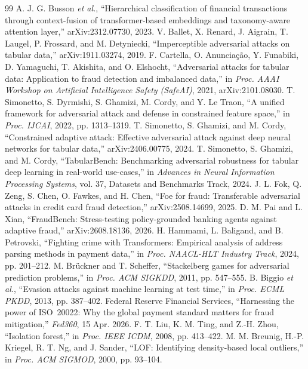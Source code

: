 \documentclass[conference]{IEEEtran}
\begin{document}
\begin{thebibliography}{99}
A. J. G. Busson \emph{et al.}, ``Hierarchical classification of financial
transactions through context-fusion of transformer-based embeddings and
taxonomy-aware attention layer,'' arXiv:2312.07730, 2023.
V. Ballet, X. Renard, J. Aigrain, T. Laugel, P. Frossard, and M. Detyniecki,
``Imperceptible adversarial attacks on tabular data,'' arXiv:1911.03274, 2019.
F. Cartella, O. Anuncia\c{c}\~ao, Y. Funabiki, D. Yamaguchi, T. Akishita, and
O. Elshocht, ``Adversarial attacks for tabular data: Application to fraud
detection and imbalanced data,'' in \emph{Proc. AAAI Workshop on Artificial
Intelligence Safety (SafeAI)}, 2021, arXiv:2101.08030.
T. Simonetto, S. Dyrmishi, S. Ghamizi, M. Cordy, and Y. Le Traon, ``A unified
framework for adversarial attack and defense in constrained feature space,''
in \emph{Proc. IJCAI}, 2022, pp. 1313--1319.
T. Simonetto, S. Ghamizi, and M. Cordy, ``Constrained adaptive attack:
Effective adversarial attack against deep neural networks for tabular data,''
arXiv:2406.00775, 2024.
T. Simonetto, S. Ghamizi, and M. Cordy, ``TabularBench: Benchmarking
adversarial robustness for tabular deep learning in real-world use-cases,'' in
\emph{Advances in Neural Information Processing Systems}, vol. 37, Datasets
and Benchmarks Track, 2024.
J. L. Fok, Q. Zeng, S. Chen, O. Fawkes, and H. Chen, ``Foe for fraud:
Transferable adversarial attacks in credit card fraud detection,''
arXiv:2508.14699, 2025.
D. M. Pai and L. Xian, ``FraudBench: Stress-testing policy-grounded banking
agents against adaptive fraud,'' arXiv:2608.18136, 2026.
H. Hammami, L. Baligand, and B. Petrovski, ``Fighting crime with
Transformers: Empirical analysis of address parsing methods in payment
data,'' in \emph{Proc. NAACL-HLT Industry Track}, 2024, pp. 201--212.
M. Br\"uckner and T. Scheffer, ``Stackelberg games for adversarial prediction
problems,'' in \emph{Proc. ACM SIGKDD}, 2011, pp. 547--555.
B. Biggio \emph{et al.}, ``Evasion attacks against machine learning at test
time,'' in \emph{Proc. ECML PKDD}, 2013, pp. 387--402.
Federal Reserve Financial Services, ``Harnessing the power of ISO~20022: Why
the global payment standard matters for fraud mitigation,'' \emph{Fed360}, 15
Apr. 2026.
F. T. Liu, K. M. Ting, and Z.-H. Zhou, ``Isolation forest,'' in \emph{Proc.
IEEE ICDM}, 2008, pp. 413--422.
M. M. Breunig, H.-P. Kriegel, R. T. Ng, and J. Sander, ``LOF: Identifying
density-based local outliers,'' in \emph{Proc. ACM SIGMOD}, 2000, pp. 93--104.
\end{thebibliography}
\end{document}
